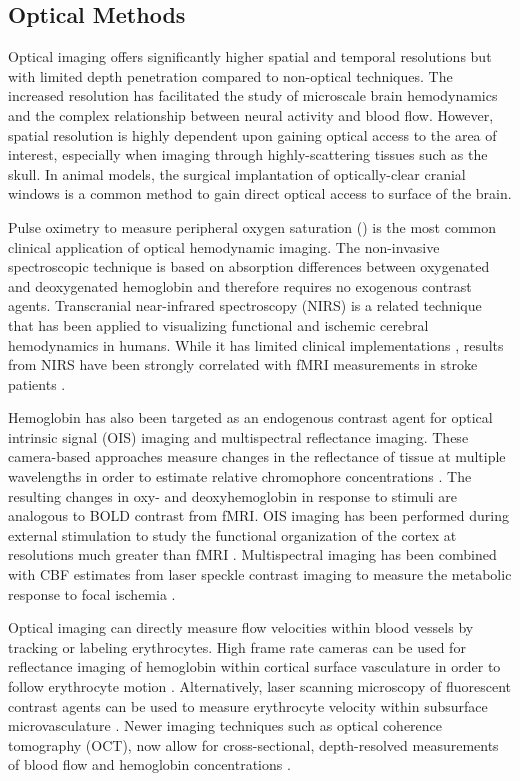\subsection{Optical Methods}

Optical imaging offers significantly higher spatial and temporal resolutions but with limited depth penetration compared to non-optical techniques. The increased resolution has facilitated the study of microscale brain hemodynamics and the complex relationship between neural activity and blood flow. However, spatial resolution is highly dependent upon gaining optical access to the area of interest, especially when imaging through highly-scattering tissues such as the skull. In animal models, the surgical implantation of optically-clear cranial windows is a common method to gain direct optical access to surface of the brain.

Pulse oximetry to measure peripheral oxygen saturation () is the most common clinical application of optical hemodynamic imaging. The non-invasive spectroscopic technique is based on absorption differences between oxygenated and deoxygenated hemoglobin and therefore requires no exogenous contrast agents. Transcranial near-infrared spectroscopy (NIRS) is a related technique that has been applied to visualizing functional \cite{Cui:2011en} and ischemic \cite{Murkin:2009eb} cerebral hemodynamics in humans. While it has limited clinical implementations \cite{Hoshi:2011gr}, results from NIRS have been strongly correlated with fMRI measurements in stroke patients \cite{Kato:2002ka}.

Hemoglobin has also been targeted as an endogenous contrast agent for optical intrinsic signal (OIS) imaging and multispectral reflectance imaging. These camera-based approaches measure changes in the reflectance of tissue at multiple wavelengths in order to estimate relative chromophore concentrations \cite{Zepeda:2004hc}. The resulting changes in oxy- and deoxyhemoglobin in response to stimuli are analogous to BOLD contrast from fMRI. OIS imaging has been performed during external stimulation to study the functional organization of the cortex at resolutions much greater than fMRI \cite{Tso:1990ba, Masino:1993tk}. Multispectral imaging has been combined with CBF estimates from laser speckle contrast imaging to measure the metabolic response to focal ischemia \cite{Jones:2008gb}.

Optical imaging can directly measure flow velocities within blood vessels by tracking or labeling erythrocytes. High frame rate cameras can be used for reflectance imaging of hemoglobin within cortical surface vasculature in order to follow erythrocyte motion \cite{Kazmi:2015du}. Alternatively, laser scanning microscopy of fluorescent contrast agents can be used to measure erythrocyte velocity within subsurface microvasculature \cite{Shih:2012bo}. Newer imaging techniques such as optical coherence tomography (OCT), now allow for cross-sectional, depth-resolved measurements of blood flow and hemoglobin concentrations \cite{Srinivasan:2009vx}.



